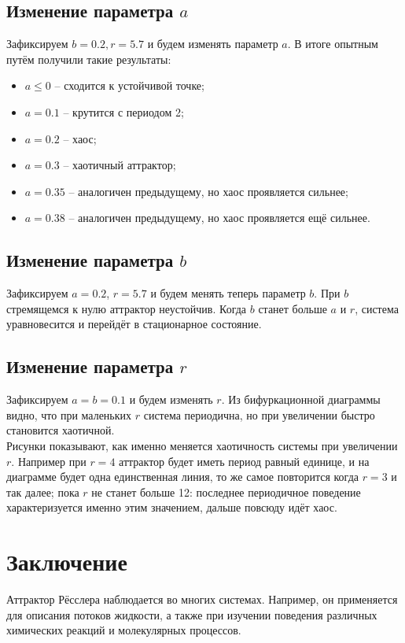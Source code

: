 \documentclass[14pt,a4paper,fleqn]{extarticle}
\begin{document}
\subsection*{Изменение параметра $a$}
Зафиксируем $b = 0.2, r = 5.7$ и будем изменять параметр $a$.
В итоге опытным путём получили такие результаты:
\begin{itemize}
	\setlength\itemsep{0.0001mm}
	\item $a \leq 0$ -- сходится к устойчивой точке;
	\item $a = 0.1$ -- крутится с периодом 2;
	\item $a = 0.2$ -- хаос;
	\item $a = 0.3$ -- хаотичный аттрактор;
	\item $a = 0.35$ -- аналогичен предыдущему, но хаос проявляется сильнее;
	\item $a = 0.38$ -- аналогичен предыдущему, но хаос проявляется ещё сильнее.
\end{itemize}
\subsection*{Изменение параметра $b$}
Зафиксируем $a = 0.2$, $r = 5.7$ и будем менять теперь параметр $b$. При $b$ стремящемся к нулю аттрактор неустойчив. Когда $b$ станет больше $a$ и $r$, система уравновесится и перейдёт в стационарное состояние.
\subsection*{Изменение параметра $r$}
Зафиксируем $a = b = 0.1$ и будем изменять $r$.
\newpage
\noindent\makebox[\linewidth]{\rule{\paperwidth}{0.4pt}}
Из бифуркационной диаграммы видно, что при маленьких $r$ система периодична, но при увеличении быстро становится хаотичной.
\noindent\makebox[\linewidth]{\rule{\paperwidth}{0.4pt}}\\
Рисунки показывают, как именно меняется хаотичность системы при увеличении $r$. Например при $r = 4$ аттрактор будет иметь период равный единице, и на диаграмме будет одна единственная линия, то же самое повторится когда $r = 3$ и так далее; пока $r$ не станет больше 12: последнее периодичное поведение характеризуется именно этим значением, дальше повсюду идёт хаос.
\section*{Заключение}
Аттрактор Рёсслера наблюдается во многих системах. Например, он применяется для описания потоков жидкости, а также при изучении поведения различных химических реакций и молекулярных процессов.
\end{document}
